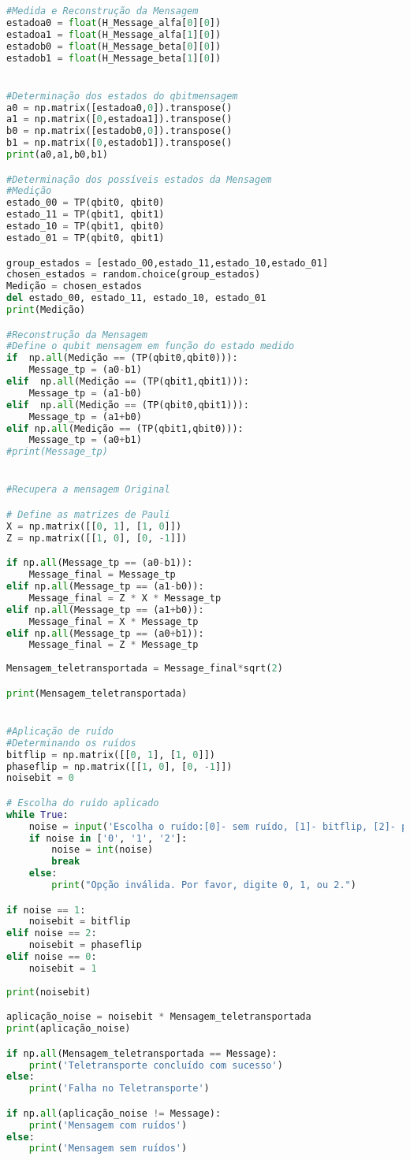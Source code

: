 \begin{lstlisting}[language=Python, caption=Protocolo de Teletransporte]
#Medida e Reconstrução da Mensagem
estadoa0 = float(H_Message_alfa[0][0])
estadoa1 = float(H_Message_alfa[1][0])
estadob0 = float(H_Message_beta[0][0])
estadob1 = float(H_Message_beta[1][0])


#Determinação dos estados do qbitmensagem
a0 = np.matrix([estadoa0,0]).transpose()
a1 = np.matrix([0,estadoa1]).transpose()
b0 = np.matrix([estadob0,0]).transpose()
b1 = np.matrix([0,estadob1]).transpose()
print(a0,a1,b0,b1)

#Determinação dos possíveis estados da Mensagem
#Medição
estado_00 = TP(qbit0, qbit0)
estado_11 = TP(qbit1, qbit1)
estado_10 = TP(qbit1, qbit0)
estado_01 = TP(qbit0, qbit1)

group_estados = [estado_00,estado_11,estado_10,estado_01]
chosen_estados = random.choice(group_estados)
Medição = chosen_estados
del estado_00, estado_11, estado_10, estado_01
print(Medição)

#Reconstrução da Mensagem
#Define o qubit mensagem em função do estado medido
if  np.all(Medição == (TP(qbit0,qbit0))):
    Message_tp = (a0-b1)
elif  np.all(Medição == (TP(qbit1,qbit1))):
    Message_tp = (a1-b0)
elif  np.all(Medição == (TP(qbit0,qbit1))):
    Message_tp = (a1+b0)
elif np.all(Medição == (TP(qbit1,qbit0))):
    Message_tp = (a0+b1)
#print(Message_tp) 


#Recupera a mensagem Original

# Define as matrizes de Pauli
X = np.matrix([[0, 1], [1, 0]])
Z = np.matrix([[1, 0], [0, -1]])

if np.all(Message_tp == (a0-b1)):
    Message_final = Message_tp
elif np.all(Message_tp == (a1-b0)):
    Message_final = Z * X * Message_tp 
elif np.all(Message_tp == (a1+b0)):
    Message_final = X * Message_tp 
elif np.all(Message_tp == (a0+b1)):
    Message_final = Z * Message_tp 
    
Mensagem_teletransportada = Message_final*sqrt(2)    

print(Mensagem_teletransportada)


#Aplicação de ruído
#Determinando os ruídos
bitflip = np.matrix([[0, 1], [1, 0]])
phaseflip = np.matrix([[1, 0], [0, -1]])
noisebit = 0

# Escolha do ruído aplicado
while True:
    noise = input('Escolha o ruído:[0]- sem ruído, [1]- bitflip, [2]- phaseflip: ')
    if noise in ['0', '1', '2']:
        noise = int(noise)
        break
    else:
        print("Opção inválida. Por favor, digite 0, 1, ou 2.")

if noise == 1:
    noisebit = bitflip
elif noise == 2:
    noisebit = phaseflip
elif noise == 0:
    noisebit = 1
    
print(noisebit)

aplicação_noise = noisebit * Mensagem_teletransportada
print(aplicação_noise)

if np.all(Mensagem_teletransportada == Message):
    print('Teletransporte concluído com sucesso')
else:
    print('Falha no Teletransporte')

if np.all(aplicação_noise != Message):
    print('Mensagem com ruídos')
else:
    print('Mensagem sem ruídos')
\end{lstlisting}